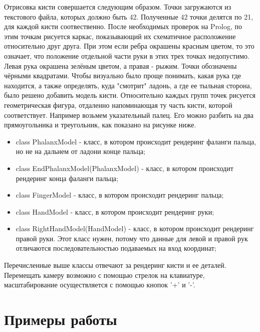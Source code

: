 \hspace{0.6cm} Отрисовка кисти совершается следующим образом. Точки загружаются из текстового файла, которых должно быть 42. Полученные 42 точки делятся по 21, для каждой кисти соотвественно. После необходимых проверок на Prolog, по этим точкам рисуется каркас, показывающий их схематичное расположение относительно друг друга. При этом если ребра окрашены красным цветом, то это означает, что положение отдельной части руки в этих трех точках недопустимо. Левая рука окрашена зелёным цветом, а правая - рыжим. Точки обозначены чёрными квадратами.
\hspace{0.6cm} Чтобы визуально было проще понимать, какая рука где находится, а также определять, куда "смотрит" ладонь, а где ее тыльная сторона, было решено добавить модель кисти.
\hspace{0.6cm} Относительно каждых групп точек рисуется геометрическая фигура, отдаленно напоминающая ту часть кисти, которой соответствует. Например возьмем указательный палец. Его можно разбить на два прямоугольника и треугольник, как показано на рисунке ниже.

\begin{itemize}
	\item class PhalanxModel - класс, в котором происходит рендеринг фаланги пальца, но не на дальнем от ладони конце пальца;
	\item class EndPhalanxModel(PhalanxModel) - класс, в котором происходит рендеринг конца фаланги пальца;
	\item class FingerModel - класс, в котором происходит рендеринг пальца;
	\item class HandModel - класс, в котором происходит рендеринг руки;
	\item class RightHandModel(HandModel) - класс, в котором происходит рендеринг правой руки. Этот класс нужен, потому что данные для левой и правой рук отличаются последовательностью подаваемых на вход координат;
\end{itemize}

\hspace{0.6cm} Перечисленные выше классы отвечают за рендеринг кисти и ее деталей.
\hspace{0.6cm} Перемещать камеру возможно с помощью стрелок на клавиатуре, масштабирование осуществляется с помощью кнопок '+' и '-'.

\section{Примеры работы}

